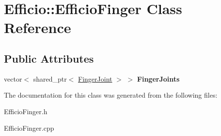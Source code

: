 \hypertarget{class_efficio_1_1_efficio_finger}{}\section{Efficio\+:\+:Efficio\+Finger Class Reference}
\label{class_efficio_1_1_efficio_finger}
\subsection*{Public Attributes}
\begin{DoxyCompactItemize}
\item 
vector$<$ shared\+\_\+ptr$<$ \hyperlink{class_efficio_1_1_finger_joint}{Finger\+Joint} $>$ $>$ {\bfseries Finger\+Joints}\hypertarget{class_efficio_1_1_efficio_finger_a94c33d41eaabccdd5e4631b4f8970032}{}\label{class_efficio_1_1_efficio_finger_a94c33d41eaabccdd5e4631b4f8970032}

\end{DoxyCompactItemize}


The documentation for this class was generated from the following files\+:\begin{DoxyCompactItemize}
\item 
Efficio\+Finger.\+h\item 
Efficio\+Finger.\+cpp\end{DoxyCompactItemize}
